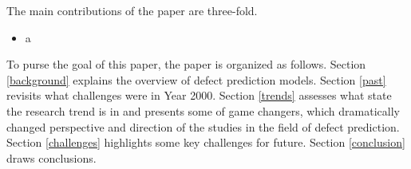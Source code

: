 The main contributions of the paper are three-fold.

\begin{itemize}
\item a
\end{itemize}

 To purse the goal of this paper, the paper is organized as follows. 
Section \ref{background} explains the overview of defect prediction models.
Section \ref{past} revisits what challenges were in Year 2000.
Section \ref{trends} assesses what state the research trend is in and presents some of game changers, which dramatically changed perspective and direction of the studies in the field of defect prediction.
Section \ref{challenges} highlights some key challenges for future.
Section \ref{conclusion} draws conclusions.
